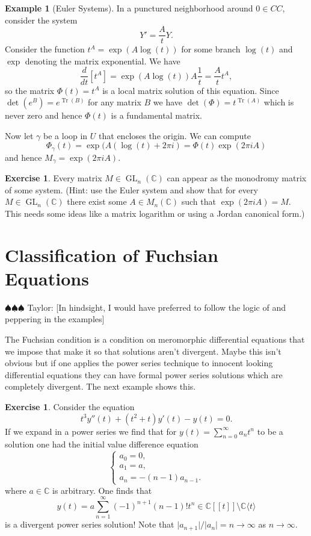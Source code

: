 \documentclass[12pt]{book}
\newcommand{\taylor}[1]{{\color{blue} \sf $\spadesuit\spadesuit\spadesuit$ Taylor: [#1]}}
\numberwithin{equation}{section}
\theoremstyle{definition}
\newtheorem{example}[theorem]{Example}
\newtheorem{exercise}[theorem]{Exercise}
\theoremstyle{remark}
\newcommand{\CC}{\mathbb{C}}
\newcommand{\GL}{\operatorname{GL}}
\newcommand{\Tr}{\operatorname{Tr}}
\begin{document}
	\begin{example}[Euler Systems]
	In a punctured neighborhood around $0 \in CC$, consider the system 
	$$ Y' = \frac{A}{t} Y. $$
	Consider the function $t^A = \exp(A \log(t))$ for some branch $\log(t)$ and $\exp$ denoting the matrix exponential. We have 
	$$\dfrac{d}{dt}\left[ t^A\right] = \exp(A \log(t) ) A \frac{1}{t} = \frac{A}{t} t^A,$$
	so the matrix $\Phi(t) = t^A$ is a local matrix solution of this equation. 
	Since $\det(e^B) = e^{\Tr(B)}$ for any matrix $B$ we have $\det(\Phi) = t^{\Tr(A)}$ which is never zero and hence $\Phi(t)$ is a fundamental matrix. 
	
	Now let $\gamma$ be a loop in $U$ that encloses the origin.  
	We can compute 
	 $$\Phi_{\gamma}(t) = \exp( A( \log(t) + 2\pi i) = \Phi(t) \exp(2\pi i A) $$
	and hence $M_{\gamma} = \exp(2\pi i A).$
\end{example}

\begin{exercise}
	Every matrix $M \in \GL_n(\CC)$ can appear as the monodromy matrix of some system. (Hint: use the Euler system and show that for every $M \in \GL_n(\CC)$ there exist some $A \in M_n(\CC)$ such that $\exp(2\pi i A) = M$. This needs some ideas like a matrix logarithm or using a Jordan canonical form.)
\end{exercise}


\section[Fuchsian Condition]{Classification of Fuchsian Equations}


\taylor{In hindsight, I would have preferred to follow the logic of \cite[Chapters III,IV]{Borel1987} and peppering in the examples}

The Fuchsian condition is a condition on meromorphic differential equations that we impose that make it so that solutions aren't divergent. 
Maybe this isn't obvious but if one applies the power series technique to innocent looking differential equations they can have formal power series solutions which are completely divergent. 
The next example shows this.
\begin{exercise}
	Consider the equation 
	 $$ t^3 y''(t) + (t^2+t) y'(t) - y(t) =0.$$
	If we expand in a power series we find that for $ y(t) = \sum_{n=0}^{\infty} a_n t^n $
	to be a solution one had the initial value difference equation
	$$\begin{cases}
	a_0 =0, \\
	a_1 = a, \\
	a_n = -(n-1)a_{n-1}.
	\end{cases}$$
	where $a \in \CC$ is arbitrary. 
	One finds that 
	$$ y(t) = a \sum_{n=1}^{\infty} (-1)^{n+1} (n-1)! t^n \in \CC[[t]]\setminus \CC\langle t \rangle$$
	is a divergent power series solution! Note that $\vert a_{n+1} \vert/\vert a_n \vert = n \to \infty$ as $n\to \infty$.
\end{exercise}	
\end{document}

